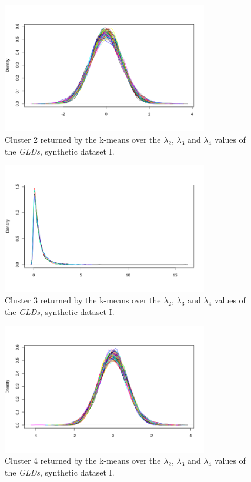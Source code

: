 \begin{figure}[H]
    \centering
    \includegraphics[width=0.8\textwidth]{img/gld_clustering/Dataset1/l2_l3_l4/cluster4.png}
    \caption{Cluster 2 returned by the k-means over the $\lambda_{2}$, $\lambda_{3}$ and $\lambda_{4}$ values of the \textit{GLDs}, synthetic dataset I.}
    \label{fig:dataset1_l2l3l4_cl2}
\end{figure}

\begin{figure}[H]
    \centering
    \includegraphics[width=0.8\textwidth]{img/gld_clustering/Dataset1/l2_l3_l4/intento_3/cluster3.png}
    \caption{Cluster 3 returned by the k-means over the $\lambda_{2}$, $\lambda_{3}$ and $\lambda_{4}$ values of the \textit{GLDs}, synthetic dataset I.}
    \label{fig:dataset1_l2l3l4_cl3}
\end{figure}

\begin{figure}[H]
    \centering
    \includegraphics[width=0.8\textwidth]{img/gld_clustering/Dataset1/l2_l3_l4/cluster5.png}
    \caption{Cluster 4 returned by the k-means over the $\lambda_{2}$, $\lambda_{3}$ and $\lambda_{4}$ values of the \textit{GLDs}, synthetic dataset I.}
    \label{fig:dataset1_l2l3l4_cl4}
\end{figure}


